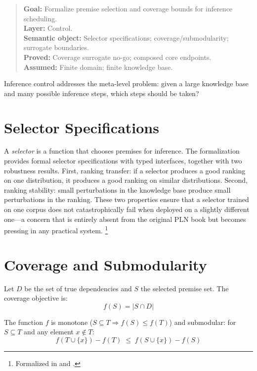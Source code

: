 \documentclass[11pt,openany]{report}
\begin{document}
\begin{quote}\small
\textbf{Goal:} Formalize premise selection and coverage bounds for inference scheduling.\\
\textbf{Layer:} Control.\\
\textbf{Semantic object:} Selector specifications; coverage/submodularity; surrogate boundaries.\\
\textbf{Proved:} Coverage surrogate no-go; composed core endpoints.\\
\textbf{Assumed:} Finite domain; finite knowledge base.
\end{quote}

Inference control addresses the meta-level problem: given a large knowledge
base and many possible inference steps, which steps should be taken?

\section{Selector Specifications}

A \emph{selector} is a function that chooses premises for inference.
The formalization provides formal selector specifications with typed
interfaces, together with two robustness results.  First, ranking
transfer: if a selector produces a good ranking on one distribution, it
produces a good ranking on similar distributions.  Second, ranking
stability: small perturbations in the knowledge base produce small
perturbations in the ranking.  These two properties ensure that a
selector trained on one corpus does not catastrophically fail when
deployed on a slightly different one---a concern that is entirely absent
from the original PLN book but becomes pressing in any practical system.%
\footnote{Formalized in  and
  .}

\section{Coverage and Submodularity}

Let $D$ be the set of true dependencies and $S$ the selected premise set.
The coverage objective is:
\[
  f(S) = |S \cap D|
\]

\begin{theorem}
\label{thm:coverage-submod}
The function $f$ is monotone ($S \subseteq T \Rightarrow f(S) \le f(T)$)
and submodular: for $S \subseteq T$ and any element $x \notin T$:
\[
  f(T \cup \{x\}) - f(T) \;\le\; f(S \cup \{x\}) - f(S)
\]
\end{theorem}
\end{document}
